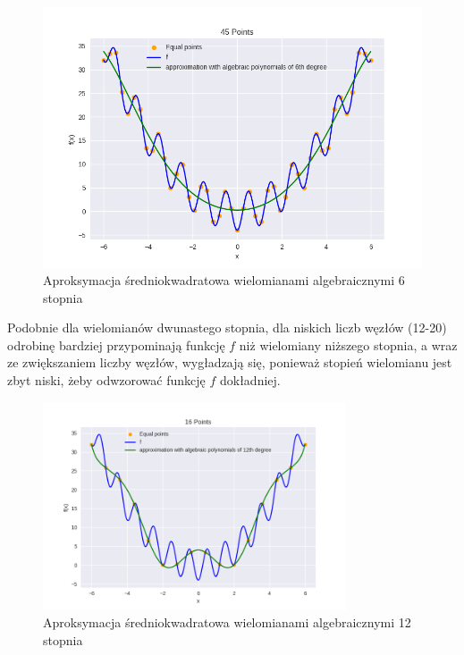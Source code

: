 \documentclass{article}
\begin{document}
\begin{figure}[H]
    \centering
    \includegraphics[width=\textwidth]{img/algpoly_6_45.png}
    \caption{Aproksymacja średniokwadratowa wielomianami algebraicznymi 6 stopnia}
\end{figure}

Podobnie dla wielomianów dwunastego stopnia, dla niskich liczb węzłów (12-20) odrobinę bardziej przypominają funkcję $f$ niż wielomiany 
niższego stopnia, a wraz ze  zwiększaniem liczby węzłów, wygładzają się, ponieważ stopień wielomianu jest zbyt niski, 
żeby odwzorować funkcję $f$ dokładniej.

\begin{figure}[H]
    \centering
    \includegraphics[width=0.8\textwidth]{img/algpoly_12_16.png}
    \caption{Aproksymacja średniokwadratowa wielomianami algebraicznymi 12 stopnia}
\end{figure}
\end{document}
